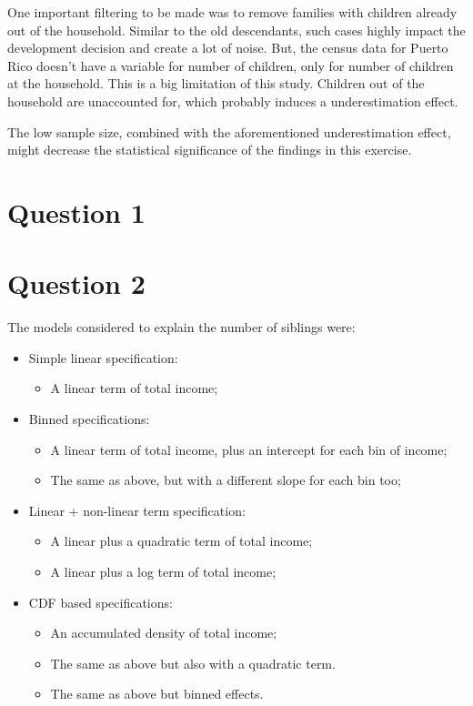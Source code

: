 \documentclass[12pt]{article}
\begin{document}
One important filtering to be made was to remove families with children already out of the household. Similar to the old descendants, such cases highly impact the development decision and create a lot of noise. But, the census data for Puerto Rico doesn't have a variable for number of children, only for number of children at the household. This is a big limitation of this study. Children out of the household are unaccounted for, which probably induces a underestimation effect.

The low sample size, combined with the aforementioned underestimation effect, might decrease the statistical significance of the findings in this exercise.


\section*{Question 1}

\section*{Question 2}
The models considered to explain the number of siblings were:

\begin{itemize}[itemsep=-0.5em]
    \item Simple linear specification:
    \begin{itemize}
        \item A linear term of total income;
    \end{itemize}
    \item Binned specifications:
    \begin{itemize}
        \item A linear term of total income, plus an intercept for each bin of income;
        \item The same as above, but with a different slope for each bin too;
    \end{itemize}
    \item Linear + non-linear term specification:
    \begin{itemize}
        \item A linear plus a quadratic term of total income;
        \item A linear plus a log term of total income;
    \end{itemize}
    \item CDF based specifications:
    \begin{itemize}
        \item An accumulated density of total income;
        \item The same as above but also with a quadratic term.
        \item The same as above but binned effects.
    \end{itemize}
\end{itemize}
\end{document}
